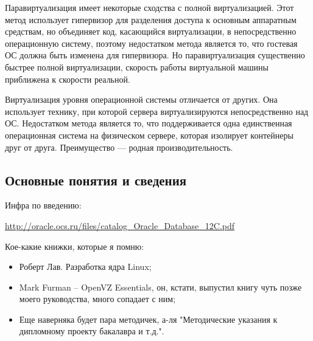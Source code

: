 Паравиртуализация имеет некоторые сходства с полной виртуализацией.
Этот метод использует гипервизор для разделения доступа к основным аппаратным средствам, но объединяет код, касающийся виртуализации, в непосредственно операционную систему, поэтому недостатком метода является то, что гостевая ОС должна быть изменена для гипервизора.
Но паравиртуализация существенно быстрее полной виртуализации, скорость работы виртуальной машины приближена к скорости реальной.

Виртуализация уровня операционной системы отличается от других.
Она использует технику, при которой сервера виртуализируются непосредственно над ОС.
Недостатком метода является то, что поддерживается одна единственная операционная система на физическом сервере, которая изолирует контейнеры друг от друга.
Преимущество --- родная производительность.



\subsection{Основные понятия и сведения}

Инфра по введению:

\url{http://oracle.ocs.ru/files/catalog_Oracle_Database_12C.pdf}


Кое-какие книжки, которые я помню:
\begin{itemize}
    \item Роберт Лав. Разработка ядра Linux;
    \item Mark Furman -- OpenVZ Essentials, он, кстати, выпустил книгу чуть позже моего руководства, много сопадает с ним;
    \item Еще наверняка будет пара методичек, а-ля "Методические указания к дипломному проекту бакалавра и т.д.".
\end{itemize}

